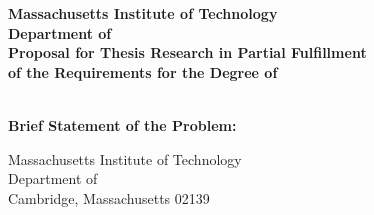 

\begin{center}
  {\Large \bf
    Massachusetts Institute of Technology\\
    Department of \deptname\\}
  \vspace{.25in}
  {\Large \bf
    Proposal for Thesis Research in Partial Fulfillment\\
    of the Requirements for the Degree of\\
    \degree\\}
\end{center}

\vspace{.5in}

\begin{figure}[h]
\centering
{}
\end{figure}

\vspace{.75in}
{\bf \sc Brief Statement of the Problem:}

\abstract

\newpage %

\begin{flushright}
   Massachusetts Institute of Technology
\\ Department of \deptname
\\ Cambridge, Massachusetts 02139
\end{flushright}

